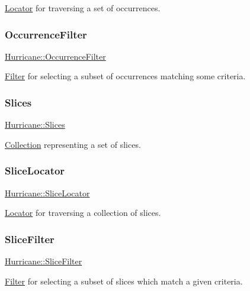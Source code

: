 \mbox{\hyperlink{classHurricane_1_1Locator}{Locator}} for traversing a set of occurrences. \mbox{\label{namespaceHurricane_a4d74662402bde091565f52b77e261560}} 
\subsubsection{\texorpdfstring{Occurrence\+Filter}{OccurrenceFilter}}
{\footnotesize\ttfamily \mbox{\hyperlink{namespaceHurricane_a4d74662402bde091565f52b77e261560}{Hurricane\+::\+Occurrence\+Filter}}}

\mbox{\hyperlink{classHurricane_1_1Filter}{Filter}} for selecting a subset of occurrences matching some criteria. \mbox{\label{namespaceHurricane_aa4a7e8a563c5687621eb5e57ade1706a}} 
\subsubsection{\texorpdfstring{Slices}{Slices}}
{\footnotesize\ttfamily \mbox{\hyperlink{namespaceHurricane_aa4a7e8a563c5687621eb5e57ade1706a}{Hurricane\+::\+Slices}}}

\mbox{\hyperlink{classHurricane_1_1Collection}{Collection}} representing a set of slices. \mbox{\label{namespaceHurricane_a5c3b720aae3437342e9d6c57729dc895}} 
\subsubsection{\texorpdfstring{Slice\+Locator}{SliceLocator}}
{\footnotesize\ttfamily \mbox{\hyperlink{namespaceHurricane_a5c3b720aae3437342e9d6c57729dc895}{Hurricane\+::\+Slice\+Locator}}}

\mbox{\hyperlink{classHurricane_1_1Locator}{Locator}} for traversing a collection of slices. \mbox{\label{namespaceHurricane_a80703f9d02b235f3291fabbf53f86d4e}} 
\subsubsection{\texorpdfstring{Slice\+Filter}{SliceFilter}}
{\footnotesize\ttfamily \mbox{\hyperlink{namespaceHurricane_a80703f9d02b235f3291fabbf53f86d4e}{Hurricane\+::\+Slice\+Filter}}}

\mbox{\hyperlink{classHurricane_1_1Filter}{Filter}} for selecting a subset of slices which match a given criteria. 